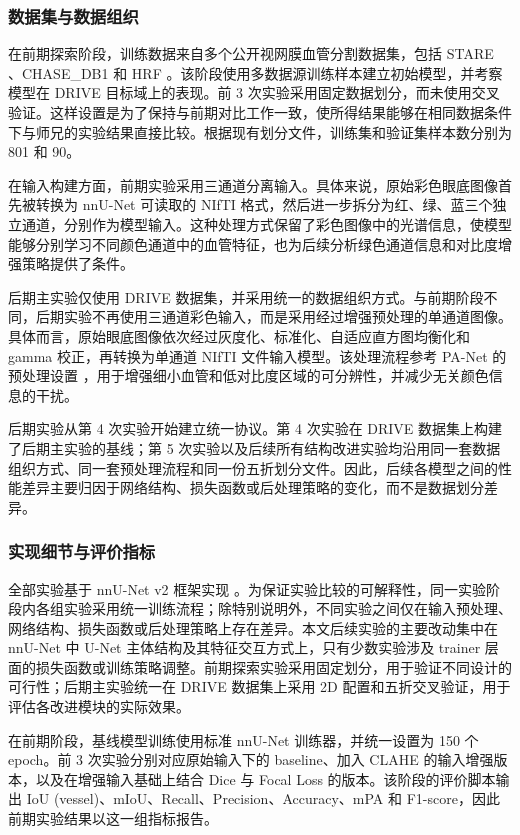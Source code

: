 \documentclass[a4paper,12pt]{article}
\begin{document}
\subsubsection{数据集与数据组织}

在前期探索阶段，训练数据来自多个公开视网膜血管分割数据集，包括 STARE \cite{hoover2000locating}、CHASE\_DB1 \cite{fraz2012ensemble} 和 HRF \cite{budai2013robust}。该阶段使用多数据源训练样本建立初始模型，并考察模型在 DRIVE 目标域上的表现。前 3 次实验采用固定数据划分，而未使用交叉验证。这样设置是为了保持与前期对比工作一致，使所得结果能够在相同数据条件下与师兄的实验结果直接比较。根据现有划分文件，训练集和验证集样本数分别为 801 和 90。

在输入构建方面，前期实验采用三通道分离输入。具体来说，原始彩色眼底图像首先被转换为 nnU-Net 可读取的 NIfTI 格式，然后进一步拆分为红、绿、蓝三个独立通道，分别作为模型输入。这种处理方式保留了彩色图像中的光谱信息，使模型能够分别学习不同颜色通道中的血管特征，也为后续分析绿色通道信息和对比度增强策略提供了条件。

后期主实验仅使用 DRIVE 数据集，并采用统一的数据组织方式。与前期阶段不同，后期实验不再使用三通道彩色输入，而是采用经过增强预处理的单通道图像。具体而言，原始眼底图像依次经过灰度化、标准化、自适应直方图均衡化和 gamma 校正，再转换为单通道 NIfTI 文件输入模型。该处理流程参考 PA-Net 的预处理设置 \cite{luo2025panet}，用于增强细小血管和低对比度区域的可分辨性，并减少无关颜色信息的干扰。

后期实验从第 4 次实验开始建立统一协议。第 4 次实验在 DRIVE 数据集上构建了后期主实验的基线；第 5 次实验以及后续所有结构改进实验均沿用同一套数据组织方式、同一套预处理流程和同一份五折划分文件。因此，后续各模型之间的性能差异主要归因于网络结构、损失函数或后处理策略的变化，而不是数据划分差异。

\subsubsection{实现细节与评价指标}

全部实验基于 nnU-Net v2 框架实现 \cite{isensee2021nnunet}。为保证实验比较的可解释性，同一实验阶段内各组实验采用统一训练流程；除特别说明外，不同实验之间仅在输入预处理、网络结构、损失函数或后处理策略上存在差异。本文后续实验的主要改动集中在 nnU-Net 中 U-Net 主体结构及其特征交互方式上，只有少数实验涉及 trainer 层面的损失函数或训练策略调整。前期探索实验采用固定划分，用于验证不同设计的可行性；后期主实验统一在 DRIVE 数据集上采用 2D 配置和五折交叉验证，用于评估各改进模块的实际效果。

在前期阶段，基线模型训练使用标准 nnU-Net 训练器，并统一设置为 150 个 epoch。前 3 次实验分别对应原始输入下的 baseline、加入 CLAHE 的输入增强版本，以及在增强输入基础上结合 Dice 与 Focal Loss 的版本。该阶段的评价脚本输出 IoU (vessel)、mIoU、Recall、Precision、Accuracy、mPA 和 F1-score，因此前期实验结果以这一组指标报告。
\end{document}

